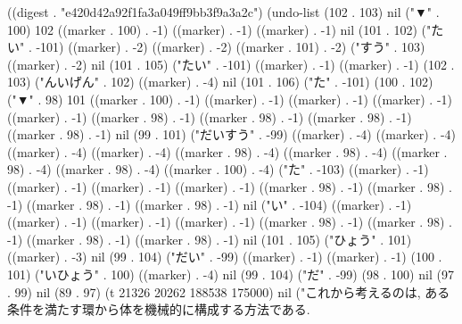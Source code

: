 
((digest . "e420d42a92f1fa3a049ff9bb3f9a3a2c") (undo-list (102 . 103) nil ("▼" . 100) 102 ((marker . 100) . -1) ((marker) . -1) ((marker) . -1) nil (101 . 102) ("たい" . -101) ((marker) . -2) ((marker) . -2) ((marker . 101) . -2) ("すう" . 103) ((marker) . -2) nil (101 . 105) ("たい" . -101) ((marker) . -1) ((marker) . -1) (102 . 103) ("んいげん" . 102) ((marker) . -4) nil (101 . 106) ("た" . -101) (100 . 102) ("▼" . 98) 101 ((marker . 100) . -1) ((marker) . -1) ((marker) . -1) ((marker) . -1) ((marker) . -1) ((marker . 98) . -1) ((marker . 98) . -1) ((marker . 98) . -1) ((marker . 98) . -1) nil (99 . 101) ("だいすう" . -99) ((marker) . -4) ((marker) . -4) ((marker) . -4) ((marker) . -4) ((marker . 98) . -4) ((marker . 98) . -4) ((marker . 98) . -4) ((marker . 98) . -4) ((marker . 100) . -4) ("た" . -103) ((marker) . -1) ((marker) . -1) ((marker) . -1) ((marker) . -1) ((marker . 98) . -1) ((marker . 98) . -1) ((marker . 98) . -1) ((marker . 98) . -1) nil ("い" . -104) ((marker) . -1) ((marker) . -1) ((marker) . -1) ((marker) . -1) ((marker . 98) . -1) ((marker . 98) . -1) ((marker . 98) . -1) ((marker . 98) . -1) nil (101 . 105) ("ひょう" . 101) ((marker) . -3) nil (99 . 104) ("だい" . -99) ((marker) . -1) ((marker) . -1) (100 . 101) ("いひょう" . 100) ((marker) . -4) nil (99 . 104) ("だ" . -99) (98 . 100) nil (97 . 99) nil (89 . 97) (t 21326 20262 188538 175000) nil ("これから考えるのは, ある条件を満たす環から体を機械的に構成する方法である.


